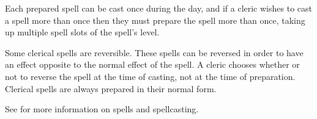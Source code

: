 \begin{multicols*}{2}
Each prepared spell can be cast once during the day, and if a cleric wishes to cast a spell more than once then they must prepare the spell more than once, taking up multiple spell slots of the spell’s level.

Some clerical spells are reversible. These spells can be reversed in order to have an effect opposite to the normal effect of the spell. A cleric chooses whether or not to reverse the spell at the time of casting, not at the time of preparation. Clerical spells are always prepared in their normal form.

See  for more information on spells and spellcasting.


\end{multicols*}
